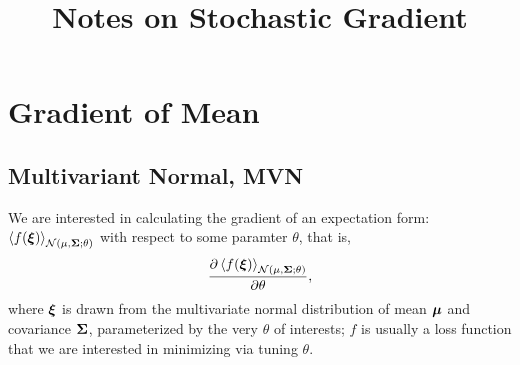 \documentclass[11pt]{article} \usepackage{textcomp,bbding,subfig}
\begin{document}
\title{Notes on Stochastic Gradient}
\maketitle
{}

\newcommand{\mvni}{\mathcal{N}(\bs{0}, \mathbf{I})}
\newcommand{\mvnp}[3]{\mathcal{N}(\mathbf{#1}, \mathbf{#2}; #3)}
\newcommand{\mvns}[2]{\mathcal{N}(\bs{#1}, \mathbf{#2})}
\newcommand{\funp}{\mean{f(\bs{\xi})}{\mvnp{\mu}{\Sigma}{\theta}}}
\newcommand{\funs}{\mean{f(\bs{\xi})}{\mvns{\mu}{\Sigma}}}
\newcommand{\dstp}{\mvnp{\mu}{\Sigma}{\theta}}
\newcommand{\dsts}{\mvns{\mu}{\Sigma}}

\section{Gradient of Mean}

\subsection{Multivariant Normal, MVN}
We are interested in calculating the gradient of an expectation form:
$\mean{f(\bs{\xi})}{\dstp}$ with respect to some paramter $\theta$,
that is,
\[ \PDV{\mean{f(\bs{\xi})}{\dstp}}{\theta}, \] where $\boldsymbol{\xi}$ is
drawn from the multivariate normal distribution of mean $\boldsymbol{\mu}$ and
covariance $\boldsymbol{\Sigma}$, parameterized by the very $\theta$ of
interests; $f$ is usually a loss function that we are interested in
minimizing via tuning $\theta$.
\end{document}
